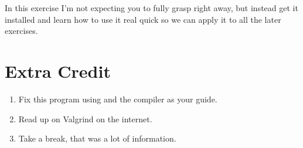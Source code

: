 In this exercise I'm not expecting you to fully grasp  right
away, but instead get it installed and learn how to use it real quick so we
can apply it to all the later exercises.

\section{Extra Credit}

\begin{enumerate}
\item Fix this program using  and the compiler as your guide.
\item Read up on Valgrind on the internet.
\item Take a break, that was a lot of information.
\end{enumerate}

